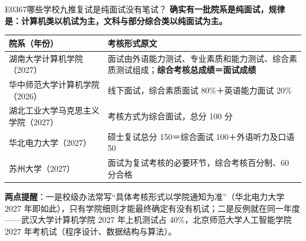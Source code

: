 \begin{qa}{E0367}{哪些学校九推复试是纯面试没有笔试？}
\textbf{确实有一批院系是纯面试，规律是：计算机类以机试为主，文科与部分综合类以纯面试为主。}

\par\vspace{2pt}\nobreak\begin{center}\footnotesize
\begin{tabularx}{\textwidth}{>{\raggedright\arraybackslash}X>{\raggedright\arraybackslash}X}
\toprule
\textbf{院系（年份）} & \textbf{考核形式原文} \\ \midrule
湖南大学计算机学院（2027） & 面试由外语能力测试、专业素质和能力测试、综合素质测试组成；\textbf{综合考核总成绩＝面试成绩} \\
华中师范大学计算机学院（2026） & 线下面试，综合素质面试 80\%＋英语能力面试 20\% \\
湖北工业大学马克思主义学院（2027） & 考核方式为综合面试，总分 100 分 \\
华北电力大学（2027） & 硕士复试总分 150＝综合面试 100＋外语听力及口语 50 \\
苏州大学（2027） & 面试为复试考核的必要环节，综合考核百分制、60 分合格 \\
\bottomrule
\end{tabularx}
\end{center}\vspace{2pt}\par

\textbf{两点提醒}：一是校级办法常写“具体考核形式以学院通知为准”（华北电力大学 2027 年即如此），只有学院细则才能最终确定有没有机试；二是反例就在同一年度——武汉大学计算机学院 2027 年上机测试占 40\%，北京师范大学人工智能学院 2027 年考机试（程序设计、数据结构与算法）。
\end{qa}

